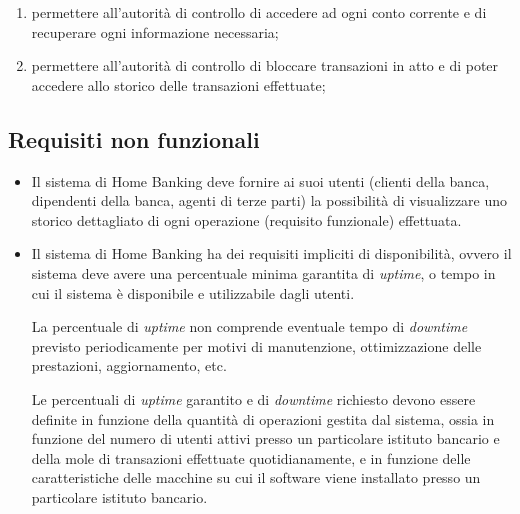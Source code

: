 \begin{enumerate}
\item permettere all'autorità di controllo di accedere ad ogni conto corrente e di recuperare ogni informazione necessaria;
\item permettere all'autorità di controllo di bloccare transazioni in atto e di poter accedere allo storico delle transazioni effettuate;

\end{enumerate}

\subsection{Requisiti non funzionali}

\begin{itemize}
	\item Il sistema di Home Banking deve fornire ai suoi utenti (clienti della banca, dipendenti della banca, agenti di terze parti) la possibilit\`a di visualizzare uno storico dettagliato di ogni operazione (requisito funzionale) effettuata.

	\item Il sistema di Home Banking ha dei requisiti impliciti di disponibilit\`a, ovvero il sistema deve avere una percentuale minima garantita di \emph{uptime}, o tempo in cui il sistema \`e disponibile e utilizzabile dagli utenti.

	La percentuale di \emph{uptime} non comprende eventuale tempo di \emph{downtime} previsto periodicamente per motivi di manutenzione, ottimizzazione delle prestazioni, aggiornamento, etc.

	Le percentuali di \emph{uptime} garantito e di \emph{downtime} richiesto devono essere definite in funzione della quantit\`a di operazioni gestita dal sistema, ossia in funzione del numero di utenti attivi presso un particolare istituto bancario e della mole di transazioni effettuate quotidianamente, e in funzione delle caratteristiche delle macchine su cui il software viene installato presso un particolare istituto bancario.


\end{itemize}

